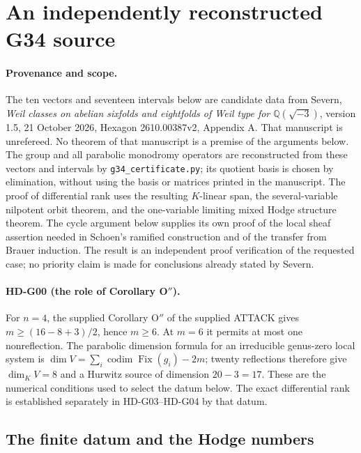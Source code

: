 \section{An independently reconstructed G34 source}
\label{sec:HD-G}

\paragraph{Provenance and scope.}
The ten vectors and seventeen intervals below are candidate data from
Severn, \emph{Weil classes on abelian sixfolds and eightfolds of Weil type
for $\mathbb Q(\sqrt{-3})$}, version 1.5, 21 October 2026,
Hexagon 2610.00387v2, Appendix A. That manuscript is unrefereed.
No theorem of that manuscript is a premise of the arguments below.
The group and all parabolic monodromy operators are reconstructed from
these vectors and intervals by \texttt{g34\_certificate.py}; its quotient
basis is chosen by elimination, without using the basis or matrices printed
in the manuscript. The proof of differential rank uses the resulting
$K$-linear span, the several-variable nilpotent orbit theorem, and the
one-variable limiting mixed Hodge structure theorem. The cycle argument
below supplies its own proof of the local sheaf assertion needed in
Schoen's ramified construction and of the transfer from Brauer induction.
The result is an independent proof verification of the requested case;
no priority claim is made for conclusions already stated by Severn.

\paragraph{HD-G00 (the role of Corollary O$''$).}
For $n=4$, the supplied Corollary O$''$ of
the supplied ATTACK gives $m\ge(16-8+3)/2$, hence $m\ge6$.
At $m=6$ it permits at most one nonreflection. The parabolic
dimension formula for an irreducible genus-zero local system is
$\dim V=\sum_i\operatorname{codim}\operatorname{Fix}(g_i)-2m$;
twenty reflections therefore give $\dim_KV=8$ and a Hurwitz source
of dimension $20-3=17$. These are the numerical conditions used to
select the datum below. The exact differential rank is established
separately in HD-G03--HD-G04 by that datum.

\subsection{The finite datum and the Hodge numbers}

